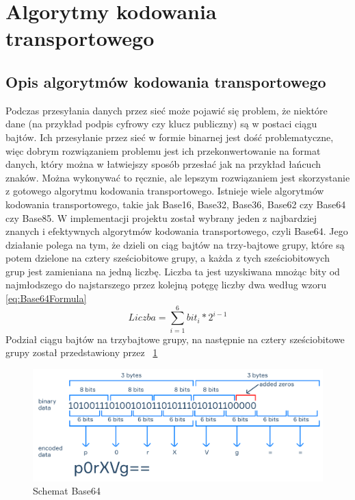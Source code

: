 \section{Algorytmy kodowania transportowego}
\label{sec:AKT}
\subsection{Opis algorytmów kodowania transportowego}
\label{ssec:AKTOpis}
Podczas przesyłania danych przez sieć może pojawić się problem, że niektóre dane (na przykład podpis cyfrowy czy klucz publiczny) są w postaci ciągu bajtów. Ich przesyłanie przez sieć w formie binarnej jest dość problematyczne, więc dobrym rozwiązaniem problemu jest ich przekonwertowanie na format danych, który można w łatwiejszy sposób przesłać jak na przykład łańcuch znaków. Można wykonywać to ręcznie, ale lepszym rozwiązaniem jest skorzystanie z gotowego algorytmu kodowania transportowego. Istnieje wiele algorytmów kodowania transportowego, takie jak Base16, Base32, Base36, Base62 czy Base64 czy Base85. W implementacji projektu został wybrany jeden z najbardziej znanych i efektywnych algorytmów kodowania transportowego, czyli Base64. Jego działanie polega na tym, że dzieli on ciąg bajtów na trzy-bajtowe grupy, które są potem dzielone na cztery sześciobitowe grupy, a każda z tych sześciobitowych grup jest zamieniana na jedną liczbę. Liczba ta jest uzyskiwana mnożąc bity od najmłodszego do najstarszego przez kolejną potęgę liczby dwa według wzoru \ref{eq:Base64Formula}
\begin{equation}
    Liczba = \sum_{i=1}^6 bit_i * 2^{i-1}
    \label{eq:Base64Formula}
\end{equation}
Podział ciągu bajtów na trzybajtowe grupy, na następnie na cztery sześciobitowe grupy został przedstawiony przez \figurename{~\ref{fig:Base64Schema}}
\begin{figure}[H]
    \centering
    \includegraphics[width=\textwidth]{Images/Base64Schema.png}
    \caption{Schemat Base64}
	\label{fig:Base64Schema}
\end{figure}
